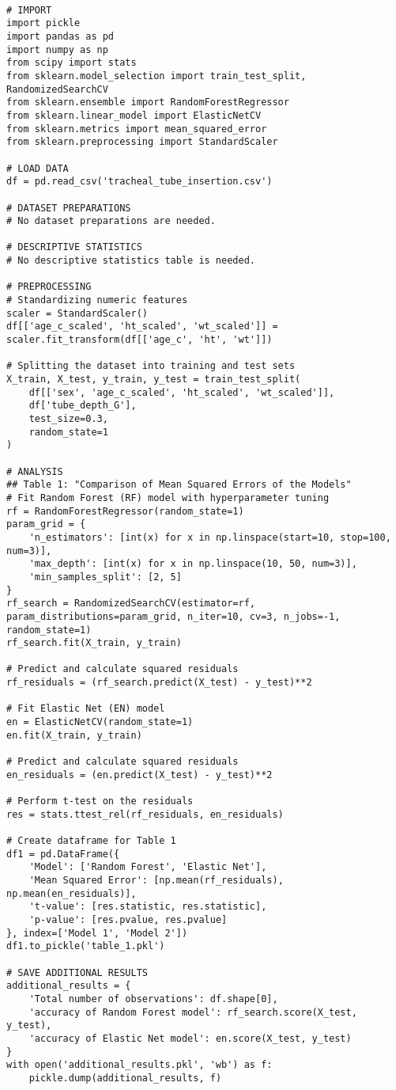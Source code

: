 \documentclass[11pt]{article}
\begin{document}
\begin{verbatim}

# IMPORT
import pickle
import pandas as pd
import numpy as np
from scipy import stats
from sklearn.model_selection import train_test_split, RandomizedSearchCV
from sklearn.ensemble import RandomForestRegressor
from sklearn.linear_model import ElasticNetCV
from sklearn.metrics import mean_squared_error
from sklearn.preprocessing import StandardScaler

# LOAD DATA
df = pd.read_csv('tracheal_tube_insertion.csv')

# DATASET PREPARATIONS
# No dataset preparations are needed.

# DESCRIPTIVE STATISTICS
# No descriptive statistics table is needed.

# PREPROCESSING 
# Standardizing numeric features
scaler = StandardScaler()
df[['age_c_scaled', 'ht_scaled', 'wt_scaled']] = scaler.fit_transform(df[['age_c', 'ht', 'wt']])

# Splitting the dataset into training and test sets
X_train, X_test, y_train, y_test = train_test_split(
    df[['sex', 'age_c_scaled', 'ht_scaled', 'wt_scaled']],
    df['tube_depth_G'],
    test_size=0.3,
    random_state=1
)

# ANALYSIS
## Table 1: "Comparison of Mean Squared Errors of the Models"
# Fit Random Forest (RF) model with hyperparameter tuning
rf = RandomForestRegressor(random_state=1)
param_grid = {
    'n_estimators': [int(x) for x in np.linspace(start=10, stop=100, num=3)],
    'max_depth': [int(x) for x in np.linspace(10, 50, num=3)],
    'min_samples_split': [2, 5]
}
rf_search = RandomizedSearchCV(estimator=rf, param_distributions=param_grid, n_iter=10, cv=3, n_jobs=-1, random_state=1)
rf_search.fit(X_train, y_train)

# Predict and calculate squared residuals
rf_residuals = (rf_search.predict(X_test) - y_test)**2

# Fit Elastic Net (EN) model
en = ElasticNetCV(random_state=1)
en.fit(X_train, y_train)

# Predict and calculate squared residuals
en_residuals = (en.predict(X_test) - y_test)**2

# Perform t-test on the residuals
res = stats.ttest_rel(rf_residuals, en_residuals)

# Create dataframe for Table 1
df1 = pd.DataFrame({
    'Model': ['Random Forest', 'Elastic Net'],
    'Mean Squared Error': [np.mean(rf_residuals), np.mean(en_residuals)],
    't-value': [res.statistic, res.statistic],
    'p-value': [res.pvalue, res.pvalue]
}, index=['Model 1', 'Model 2'])
df1.to_pickle('table_1.pkl')

# SAVE ADDITIONAL RESULTS
additional_results = {
    'Total number of observations': df.shape[0],
    'accuracy of Random Forest model': rf_search.score(X_test, y_test),
    'accuracy of Elastic Net model': en.score(X_test, y_test)
}
with open('additional_results.pkl', 'wb') as f:
    pickle.dump(additional_results, f)

\end{verbatim}
\end{document}

